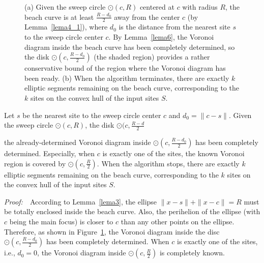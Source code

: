 {{\begin{figure}[!h]
\begin{center}
\end{center}
\vspace{-0.1in}\caption{(a) Given the sweep circle $\odot(c,R)$ centered at $c$
with radius $R$, the beach curve is at least $\frac{R-d_0}{2}$ away
from the center $c$ (by Lemma~\ref{lema4_1}), where $d_0$ is the
distance from the nearest site $s$ to the sweep circle center $c$.
By Lemma~\ref{lema6}, the Voronoi diagram inside the beach curve has
been completely determined, so the disk $\odot(c,\frac{R-d_0}{2})$
(the shaded region) provides a rather conservative bound of the
region where the Voronoi diagram has been ready. (b) When the
algorithm terminates, there are exactly $k$ elliptic segments
remaining on the beach curve, corresponding to the $k$ sites on the
convex hull of the input sites $S$.\label{fig:coverDomain}}
\end{figure}


 \vspace{0.1in}\begin{lemma}\label{thm:radiusControl} Let $s$
be the nearest site to the sweep circle center $c$ and $d_0=\|c-s\|$.
Given the sweep circle $\odot(c,R)$, the disk
$\odot(c,\frac{R-d}{2}$


the already-determined Voronoi diagram inside
$\odot(c,\frac{R-d_0}{2})$ has been completely determined.
Especially, when $c$ is exactly one of the sites, the known Voronoi
region is covered by $\odot(c,\frac{R}{2})$. When the algorithm
stops, there are exactly $k$ elliptic segments remaining on the
beach curve, corresponding to the $k$ sites on the convex hull of
the input sites $S$.
\end{lemma}
\vspace{0.1in}\noindent\textit{Proof:}~~According to
Lemma~\ref{lema3}, the ellipse $\|x-s\|+\|x-c\|=R$ must be totally
enclosed inside the beach curve. Also, the perihelion of the ellipse
(with $c$ being the main focus) is closer to $c$ than any other
points on the ellipse.  Therefore, as shown in
Figure~\ref{fig:coverDomain}, the Voronoi diagram inside the disc
$\odot(c,\frac{R-d_0}{2})$ has been completely determined. When $c$
is exactly one of the sites, i.e., $d_0=0$, the Voronoi diagram
inside $\odot(c,\frac{R}{2})$ is completely known.

}}
